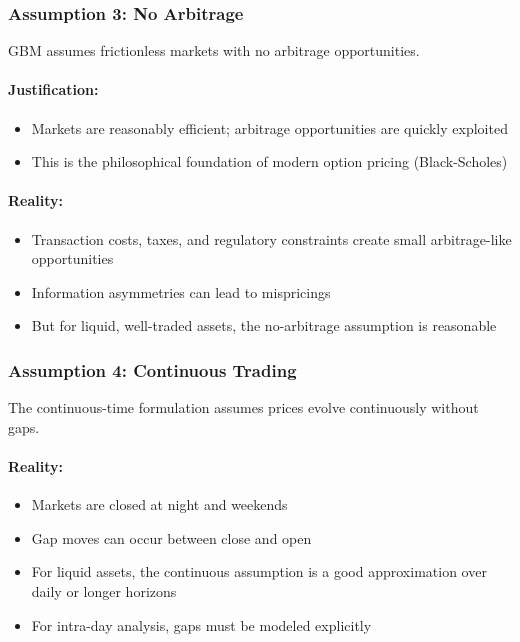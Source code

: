 \documentclass[12pt,a4paper]{article}
\begin{document}
\subsubsection{Assumption 3: No Arbitrage}

GBM assumes frictionless markets with no arbitrage opportunities.

\paragraph{Justification:}
\begin{itemize}
    \item Markets are reasonably efficient; arbitrage opportunities are quickly exploited
    \item This is the philosophical foundation of modern option pricing (Black-Scholes)
\end{itemize}

\paragraph{Reality:}
\begin{itemize}
    \item Transaction costs, taxes, and regulatory constraints create small arbitrage-like opportunities
    \item Information asymmetries can lead to mispricings
    \item But for liquid, well-traded assets, the no-arbitrage assumption is reasonable
\end{itemize}

\subsubsection{Assumption 4: Continuous Trading}

The continuous-time formulation assumes prices evolve continuously without gaps.

\paragraph{Reality:}
\begin{itemize}
    \item Markets are closed at night and weekends
    \item Gap moves can occur between close and open
    \item For liquid assets, the continuous assumption is a good approximation over daily or longer horizons
    \item For intra-day analysis, gaps must be modeled explicitly
\end{itemize}
\end{document}
